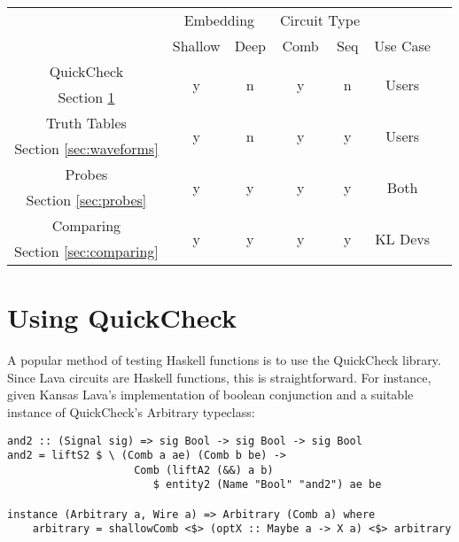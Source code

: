 \documentclass{llncs}
\begin{document}
\begin{center}
\label{table:approaches}
\begin{tabular}{l | c | c | c | c | c | c |}
\cline{2-5}
& \multicolumn{2}{|c|}{Embedding}
& \multicolumn{2}{c|}{Circuit Type}
& \multicolumn{1}{|c}{}\\
\cline{2-6}
 & Shallow & Deep & Comb & Seq & Use Case \\
\hline
\multicolumn{1}{|c|}{QuickCheck} & \multirow{2}{*}{y} & \multirow{2}{*}{n} & \multirow{2}{*}{y} & \multirow{2}{*}{n} & \multirow{2}{*}{Users} \\
\multicolumn{1}{|c|}{\footnotesize{Section \ref{sec:quickcheck}}} & & & & & \\
\hline
\multicolumn{1}{|c|}{Truth Tables} & \multirow{2}{*}{y} & \multirow{2}{*}{n} & \multirow{2}{*}{y} & \multirow{2}{*}{y} & \multirow{2}{*}{Users} \\
\multicolumn{1}{|c|}{\footnotesize{Section \ref{sec:waveforms}}} & & & & & \\
\hline
\multicolumn{1}{|c|}{Probes} & \multirow{2}{*}{y} & \multirow{2}{*}{y} & \multirow{2}{*}{y} & \multirow{2}{*}{y} & \multirow{2}{*}{Both} \\
\multicolumn{1}{|c|}{\footnotesize{Section \ref{sec:probes}}} & & & & & \\
\hline
\multicolumn{1}{|c|}{Comparing} & \multirow{2}{*}{y} & \multirow{2}{*}{y} & \multirow{2}{*}{y} & \multirow{2}{*}{y} & \multirow{2}{*}{KL Devs} \\
\multicolumn{1}{|c|}{\footnotesize{Section \ref{sec:comparing}}} & & & & & \\
\hline
\end{tabular}


\end{center}

\section{Using QuickCheck}
\label{sec:quickcheck}

A popular method of testing Haskell functions is to use the QuickCheck library.
Since Lava circuits are Haskell functions, this is straightforward.
For instance, given Kansas Lava's implementation of boolean conjunction and
a suitable instance of QuickCheck's Arbitrary typeclass:

\begin{verbatim}
and2 :: (Signal sig) => sig Bool -> sig Bool -> sig Bool
and2 = liftS2 $ \ (Comb a ae) (Comb b be) ->
                    Comb (liftA2 (&&) a b)
                       $ entity2 (Name "Bool" "and2") ae be

instance (Arbitrary a, Wire a) => Arbitrary (Comb a) where
    arbitrary = shallowComb <$> (optX :: Maybe a -> X a) <$> arbitrary
\end{verbatim}
\end{document}
